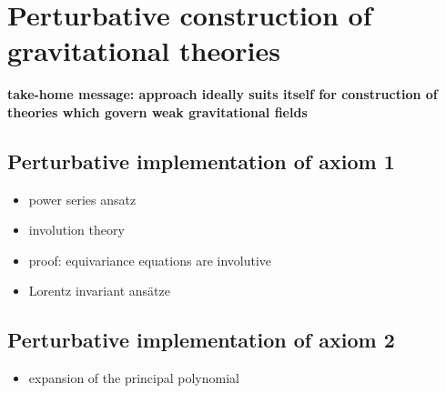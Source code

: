 \chapter{Perturbative construction of gravitational theories}

\textbf{take-home message: approach ideally suits itself for construction of theories which govern weak gravitational fields}

\section{Perturbative implementation of axiom 1}
\begin{itemize}
\item power series ansatz
\item involution theory
\item proof: equivariance equations are involutive
\item Lorentz invariant ansätze
\end{itemize}

\section{Perturbative implementation of axiom 2}
\begin{itemize}
\item expansion of the principal polynomial
\end{itemize}

